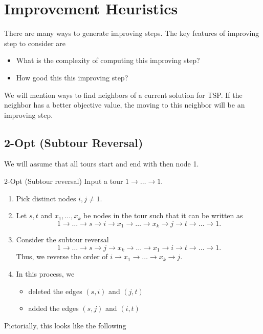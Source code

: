 \section{Improvement Heuristics}
There are many ways to generate improving steps.  The key features of improving step to consider are
\begin{itemize}
\item What is the complexity of  computing this improving step?
\item How good this this improving step?
\end{itemize}

We will mention ways to find neighbors of a current solution for TSP.  If the neighbor has a better objective value, the moving to this neighbor will be an improving step. 


\subsection{2-Opt (Subtour Reversal)}
We will assume that all tours start and end with then node 1.  

\begin{general}{2-Opt (Subtour reversal)}{}
Input a tour $1 \to \dots \to 1$. 
\begin{enumerate}
\item Pick distinct nodes $i,j \neq 1$.
\item Let $s,t$ and $x_1, \dots, x_k$ be nodes in the tour such that it can be written as 
$$
1 \to \dots \to s \to i \to x_1 \to \dots \to x_k  \to j \to t \to \dots \to 1.
$$
\item Consider the subtour reversal
$$
1 \to \dots \to s \to j \to x_k \to \dots \to x_1  \to i \to t \to \dots \to 1.
$$
Thus, we reverse the order of $ i \to x_1 \to \dots \to x_k \to j$.  
\item In this process, we 
\begin{itemize}
\item deleted the edges $(s,i)$ and $(j,t)$
\item added the edges $(s,j)$ and $(i,t)$
\end{itemize}
\end{enumerate}
\end{general}
Pictorially, this looks like the following 


